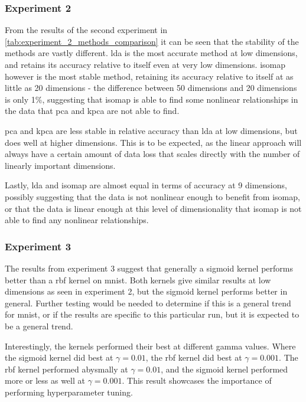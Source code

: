 \subsubsection{Experiment 2}\label{subsec:experiment-2}
From the results of the second experiment in \autoref{tab:experiment_2_methods_comparison} it can be seen that the stability of the methods are vastly different. \gls{lda} is the most accurate method at low dimensions, and retains its accuracy relative to itself even at very low dimensions. \gls{isomap} however is the most stable method, retaining its accuracy relative to itself at as little as 20 dimensions - the difference between 50 dimensions and 20 dimensions is only 1\%, suggesting that \gls{isomap} is able to find some nonlinear relationships in the data that \gls{pca} and \gls{kpca} are not able to find.

\gls{pca} and \gls{kpca} are less stable in relative accuracy than \gls{lda} at low dimensions, but does well at higher dimensions. This is to be expected, as the linear approach will always have a certain amount of data loss that scales directly with the number of linearly important dimensions.

Lastly, \gls{lda} and \gls{isomap} are almost equal in terms of accuracy at 9 dimensions, possibly suggesting that the data is not nonlinear enough to benefit from \gls{isomap}, or that the data is linear enough at this level of dimensionality that \gls{isomap} is not able to find any nonlinear relationships.



\subsubsection{Experiment 3}\label{subsec:experiment-3}
The results from experiment 3 suggest that generally a sigmoid kernel performs better than a \gls{rbf} kernel on \gls{mnist}. Both kernels give similar results at low dimensions as seen in experiment 2, but the sigmoid kernel performs better in general. Further testing would be needed to determine if this is a general trend for \gls{mnist}, or if the results are specific to this particular run, but it is expected to be a general trend.

Interestingly, the kernels performed their best at different gamma values. Where the sigmoid kernel did best at $\gamma = 0.01$, the \gls{rbf} kernel did best at $\gamma = 0.001$. The \gls{rbf} kernel performed abysmally at $\gamma = 0.01$, and the sigmoid kernel performed more or less as well at $\gamma = 0.001$. This result showcases the importance of performing hyperparameter tuning.

